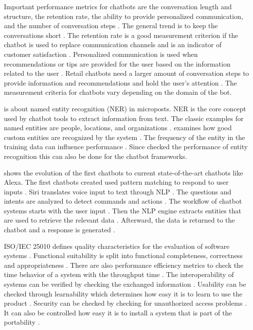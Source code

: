 Important performance metrics for chatbots are the conversation length and structure, the retention rate, the ability to 
provide personalized communication, and the number of conversation steps \cite{PRZEGALINSKA2019785}.
The general trend is to keep the conversations short \cite{PRZEGALINSKA2019785}.
The retention rate is a good measurement criterion if the chatbot is used to replace communication channels 
and is an indicator of customer satisfaction \cite{PRZEGALINSKA2019785}.
Personalized communication is used when recommendations or tips are provided for the user based on the 
information related to the user \cite{PRZEGALINSKA2019785}.
Retail chatbots need a larger amount of conversation steps to provide information and recommendations 
and hold the user's attention \cite{PRZEGALINSKA2019785}.
The measurement criteria for chatbots vary depending on the domain of the bot.

\citet{geyer2016named} is about named entity recognition (NER) in microposts.
NER is the core concept used by chatbot tools to extract information from text.
The classic examples for named entities are people, locations, and organizations \cite{geyer2016named}.
\citet{geyer2016named} examines how good custom entities are recognized by the system \citet{geyer2016named}.
The frequency of the entity in the training data can influence performance \cite{geyer2016named}. 
Since \citet{geyer2016named} checked the performance of entity recognition this can also be done for the chatbot frameworks.

\citet{deshpande2017survey} shows the evolution of the first chatbots to current state-of-the-art chatbots like Alexa.
The first chatbots created used pattern matching to respond to user inputs \cite{deshpande2017survey}.
Siri translates voice input to text through NLP \cite{deshpande2017survey}. 
The questions and intents are analyzed to detect commands and actions \cite{deshpande2017survey}.
The workflow of chatbot systems starts with the user input \cite{deshpande2017survey}. 
Then the NLP engine extracts entities that are used to retrieve the relevant data \cite{deshpande2017survey}.
Afterward, the data is returned to the chatbot and a response is generated \cite{deshpande2017survey}.



ISO/IEC 25010 defines quality characteristics for the evaluation of software systems \cite{iso25010}.
Functional suitability is split into functional completeness, correctness and appropriateness \cite{iso25010}.
There are also performance efficiency metrics to check the time behavior of a system with the throughput time \cite{iso25010}.
The interoperability of systems can be verified by checking the exchanged information \cite{iso25010}.
Usability can be checked through learnability which determines how easy it is to learn to use the product \cite{iso25010}.
Security can be checked by checking for unauthorized access problems \cite{iso25010}.
It can also be controlled how easy it is to install a system that is part of the portability \cite{iso25010}.

